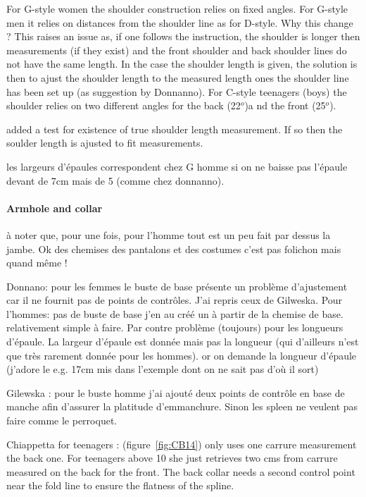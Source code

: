 \documentclass[11pt,a4paper]{article}
\begin{document}
For G-style women the shoulder construction relies on fixed angles. For G-style men it relies on distances from the shoulder line as for D-style. Why  this change ? This raises an issue as, if one follows the instruction, the shoulder is longer then measurements (if they exist) and the front shoulder and back shoulder lines do not have the same length. In the case the shoulder length is given, the solution is then to ajust the shoulder length to the measured length ones the shoulder line has been set up (as suggestion by Donnanno).
For C-style teenagers (boys) the shoulder relies on two different angles for the back (22$^o$)a nd the front (25$^o$). 

added a test for existence of true shoulder length measurement. If so then the soulder length is ajusted to fit measurements.

les largeurs d'épaules correspondent chez G homme si on ne baisse pas l'épaule devant de 7cm mais de 5 (comme chez donnanno).

\paragraph{Armhole and collar}

à noter que, pour une fois, pour l'homme tout est un peu fait par dessus 
la jambe. Ok des chemises des pantalons et des costumes c'est pas 
folichon mais quand même !

Donnano:  pour les femmes le buste de base présente un problème d'ajustement car il ne 
fournit pas de points de contrôles. J'ai repris ceux de Gilweska. 
Pour l'hommes: pas de buste de base j'en au  créé un à partir de la chemise de base. 
relativement simple à faire. Par contre problème (toujours) pour les 
longueurs d'épaule. La largeur d'épaule est donnée mais pas la 
longueur (qui d'ailleurs n'est que très rarement donnée pour les 
hommes). or on demande la longueur d'épaule (j'adore le e.g. 17cm mis 
dans l'exemple dont on ne sait pas d'où il sort) 

Gilewska : pour le buste homme j'ai ajouté  deux points de contrôle 
en base de manche  afin d'assurer la platitude d'emmanchure. Sinon les 
spleen ne veulent pas faire comme le perroquet.


Chiappetta for teenagers :  (figure~\ref{fig:CB14}) only uses one carrure measurement the back one. For teenagers above 10 she just retrieves two cms from  carrure measured on the back for the front. The back collar needs a second control point near the fold line to ensure the flatness of the spline.
\end{document}

